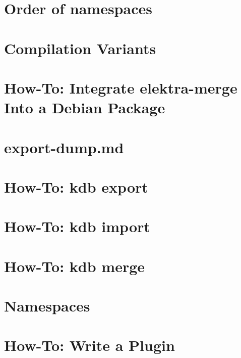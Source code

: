 \documentclass[twoside]{book}
\newcommand{\+}{\discretionary{\mbox{\scriptsize$\hookleftarrow$}}{}{}}
\begin{document}
\chapter{Order of namespaces}
\label{doc_tutorials_cascading_md}
\hypertarget{doc_tutorials_cascading_md}{}

\chapter{Compilation Variants}
\label{doc_tutorials_compilation-variants_md}
\hypertarget{doc_tutorials_compilation-variants_md}{}

\chapter{How-\/\+To\+: Integrate elektra-\/merge Into a Debian Package}
\label{doc_tutorials_elektra-merge-integration_md}
\hypertarget{doc_tutorials_elektra-merge-integration_md}{}

\chapter{export-\/dump.md}
\label{doc_tutorials_export-dump_md}
\hypertarget{doc_tutorials_export-dump_md}{}

\chapter{How-\/\+To\+: kdb export}
\label{doc_tutorials_export_md}
\hypertarget{doc_tutorials_export_md}{}

\chapter{How-\/\+To\+: kdb import}
\label{doc_tutorials_import_md}
\hypertarget{doc_tutorials_import_md}{}

\chapter{How-\/\+To\+: kdb merge}
\label{doc_tutorials_merge_md}
\hypertarget{doc_tutorials_merge_md}{}

\chapter{Namespaces}
\label{doc_tutorials_namespaces_md}
\hypertarget{doc_tutorials_namespaces_md}{}

\chapter{How-\/\+To\+: Write a Plugin}
\label{doc_tutorials_plugins_md}
\hypertarget{doc_tutorials_plugins_md}{}

\end{document}
